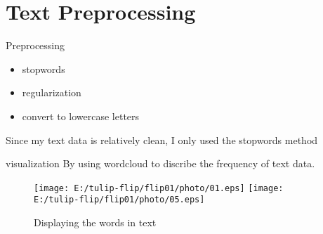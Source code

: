\documentclass[
 size=12pt,
 paper=smartboard, %
 mode=present, %
 display=slides, %
style=tuliplab,
pauseslide,
fleqn,leqno]{powerdot}
\begin{document}
\section{Text Preprocessing}

\begin{slide}{Preprocessing}
\vspace{1cm}
\begin{itemize}
  \item stopwords
  \item regularization
  \item convert to lowercase letters
\end{itemize}
\vspace{1cm}
Since my text data is relatively clean, I only used the stopwords method
\end{slide}

\begin{slide}{visualization}
By using wordcloud to discribe the frequency of text data.\\
\hspace{1.5cm}
\begin{figure}[ht]%
  \centering%
  \texttt{[image: E:/tulip-flip/flip01/photo/01.eps]}
  \texttt{[image: E:/tulip-flip/flip01/photo/05.eps]}
  \caption{Displaying the words in text}%
  \end{figure} 
\end{slide}
\end{document}
